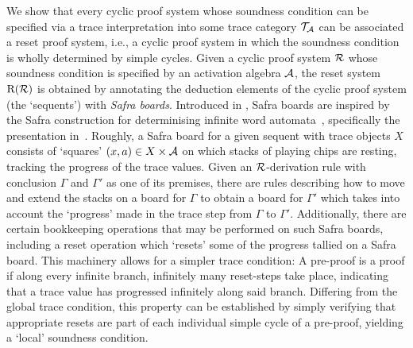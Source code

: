 We show that every cyclic proof system whose soundness condition can be
specified via a trace interpretation into some trace category $\mathcal{T}_{\mathcal{A}}$
can be associated a reset proof system, i.e., a cyclic proof system in which the soundness condition is wholly determined by simple cycles.
Given a cyclic proof system $\mathcal{R}$ whose soundness condition is specified by an activation algebra $\mathcal{A}$, the reset system $\mathrm{R}(\mathcal{R})$ is obtained by annotating the deduction elements of the cyclic proof system (the `sequents') with \emph{Safra boards}.
Introduced in
, Safra boards are inspired by the Safra construction for determinising infinite word automata~\parencite{safraComplexityOmegaAutomata1988}, specifically the presentation in~\parencite{kozenSafraConstruction2006}.
Roughly, a Safra board for a given sequent
with trace objects $X$ consists of `squares' $(x, a) \in X \times \mathcal{A}$ on which
stacks of playing chips are resting, tracking the progress of the trace
values. Given an $\mathcal{R}$-derivation rule with conclusion $\Gamma$ and $\Gamma'$ as
one of its premises, there are rules describing how to move and extend the
stacks on a board for $\Gamma$ to obtain a board for $\Gamma'$ which takes into
account the `progress' made in the trace step from $\Gamma$ to $\Gamma'$.
Additionally, there are certain bookkeeping operations that may be performed on
such Safra boards, including a reset operation which `resets' some of the
progress tallied on a Safra board. This machinery allows for a simpler trace
condition: A pre-proof is a proof if along every infinite branch, infinitely
many reset-steps take place, indicating that a trace value has progressed
infinitely along said branch. 
Differing from the global trace condition, this property can be
established by simply verifying that appropriate resets are part of each
individual simple cycle of a pre-proof, yielding a `local' soundness condition.

